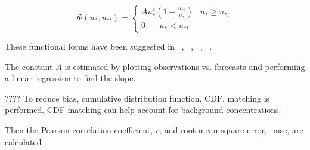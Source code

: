 \begin{equation}
\Phi(u_*, u_{*t}) =\begin{cases}
Au_*^4 (1-\frac{u_{*t}}{u_{*}})  \;\;\; u_{*} \geq u_{*t} \\
0 \;\;\;\;\;\;  u_* < u_{*t} 
\end{cases}
\label{eq:gillette}
\end{equation}

These functional forms have been suggested in ~\cite{Shao08}, ~\cite{Gillette}, ~\cite{Marticorena}, ~\cite{Leadbetter12}.

The constant $A$ is estimated by plotting observations vs. forecasts and performing a linear regression to find the slope.

????
To reduce bias, cumulative distribution function, CDF,  matching is performed. CDF matching can help account for
background concentrations.

Then the Pearson correlation coefficient, $r$,  and root mean square error, rmse, are calculated 


